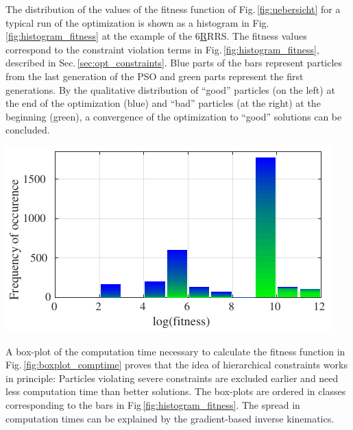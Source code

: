 \documentclass[fleqn,a4paper,10pt]{article}
\renewenvironment{figure}
  {\par\vspace{6pt}\noindent\minipage{\linewidth}}
  {\endminipage\par\vspace{6pt}}
\begin{document}
\begin{multicols}{2}
The distribution of the values of the fitness function of Fig.\,\ref{fig:uebersicht} for a typical run of the optimization is shown as a histogram in Fig.\,\ref{fig:histogram_fitness} at the example of the 6\underline{R}RRS.
The fitness values correspond to the constraint violation terms in Fig.\,\ref{fig:histogram_fitness}, described in Sec.\,\ref{sec:opt_constraints}.
Blue parts of the bars represent particles from the last generation of the PSO and green parts represent the first generations.
By the qualitative distribution of ``good'' particles (on the left) at the end of the optimization (blue) and ``bad'' particles (at the right) at the beginning (green), a convergence of the optimization to ``good'' solutions can be concluded.
%
\begin{figure}
\centering
\includegraphics[align=t,smash=br,]{./Bilder/figure_histogram_fitness.pdf}

\vspace{-0.4cm} %
\label{fig:histogram_fitness}
\end{figure}
%
A box-plot of the computation time necessary to calculate the fitness function in Fig.\,\ref{fig:boxplot_comptime} proves that the idea of hierarchical constraints works in principle: Particles violating severe constraints are excluded earlier and need less computation time than better solutions.
The box-plots are ordered in classes corresponding to the bars in Fig\,\ref{fig:histogram_fitness}.
The spread in computation times can be explained by the gradient-based inverse kinematics.


\end{multicols}
\end{document}
